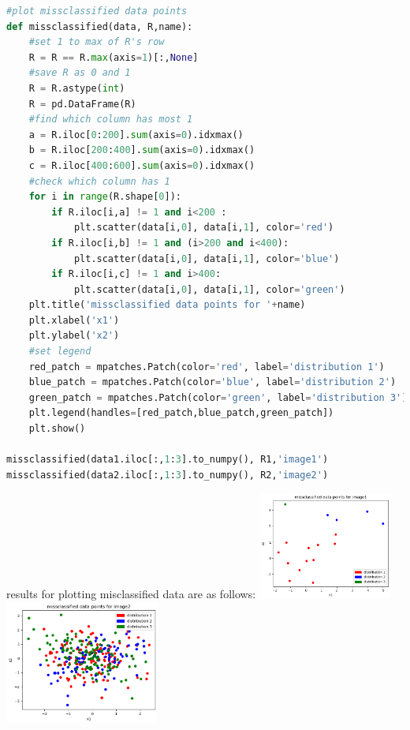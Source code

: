 \documentclass[12pt]{article}
\begin{document}
\begin{qsolve}
\begin{lstlisting}[language=Python,caption={plot misclassified data},label={code:plot misclassified data}]
#plot missclassified data points
def missclassified(data, R,name):
    #set 1 to max of R's row
    R = R == R.max(axis=1)[:,None]
    #save R as 0 and 1
    R = R.astype(int)
    R = pd.DataFrame(R) 
    #find which column has most 1
    a = R.iloc[0:200].sum(axis=0).idxmax()
    b = R.iloc[200:400].sum(axis=0).idxmax()
    c = R.iloc[400:600].sum(axis=0).idxmax()
    #check which column has 1
    for i in range(R.shape[0]):
        if R.iloc[i,a] != 1 and i<200 :
            plt.scatter(data[i,0], data[i,1], color='red')
        if R.iloc[i,b] != 1 and (i>200 and i<400):
            plt.scatter(data[i,0], data[i,1], color='blue')
        if R.iloc[i,c] != 1 and i>400:
            plt.scatter(data[i,0], data[i,1], color='green')
    plt.title('missclassified data points for '+name)
    plt.xlabel('x1')
    plt.ylabel('x2')
    #set legend
    red_patch = mpatches.Patch(color='red', label='distribution 1')
    blue_patch = mpatches.Patch(color='blue', label='distribution 2')
    green_patch = mpatches.Patch(color='green', label='distribution 3')
    plt.legend(handles=[red_patch,blue_patch,green_patch])
    plt.show()

missclassified(data1.iloc[:,1:3].to_numpy(), R1,'image1')
missclassified(data2.iloc[:,1:3].to_numpy(), R2,'image2')
        \end{lstlisting}
    \splitqsolve
    results for plotting misclassified data are as follows:
    \tcblower
    \centering
    \includegraphics[width=0.33\textwidth]{outputs/output18.png}
    \label{fig:fig18}
    \splitqsolve
    \centering
    \includegraphics[width=0.38\textwidth]{outputs/output19.png}
    \label{fig:fig19}
\end{qsolve}
\end{document}

